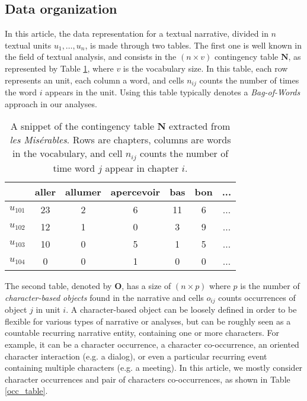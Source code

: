 \documentclass[
twocolumn,
]{ceurart}
\begin{document}
\subsection{Data organization}

In this article, the data representation for a textual narrative, divided in $n$ textual units $u_1, \ldots, u_n$, is made through two tables. The first one is well known in the field of textual analysis, and consists in the $(n \times v)$ contingency table $\mathbf{N}$, as represented by Table \ref{cont_table}, where $v$ is the vocabulary size. In this table, each row represents an unit, each column a word, and cells $n_{ij}$ counts the number of times the word $i$ appears in the unit. Using this table typically denotes a \emph{Bag-of-Words} approach in our analyses.

\begin{table}[h]
	\scriptsize
	\begin{tabular}{|c||c|c|c|c|c|c|}
		\hline
		& aller & allumer & apercevoir & bas & bon & ... \\
		\hline
		\hline 
		$u_{101}$ & 23 & 2 & 6 & 11 & 6 & ... \\
		\hline
		$u_{102}$ & 12 & 1 & 0 & 3 & 9 & ... \\
		\hline
		$u_{103}$ & 10 & 0 & 5 & 1 & 5 & ... \\
		\hline
		$u_{104}$ & 0 & 0 & 1 & 0 & 0 & ... \\
		\hline
	\end{tabular}
	\label{cont_table}
	\caption{A snippet of the contingency table $\mathbf{N}$ extracted from \emph{les Misérables}. Rows are chapters, columns are words in the vocabulary, and cell $n_{ij}$ counts the number of time word $j$ appear in chapter $i$.}
\end{table}

The second table, denoted by $\mathbf{O}$, has a size of $(n \times p)$ where $p$ is the number of \emph{character-based objects} found in the narrative and cells $o_{ij}$ counts occurrences of object $j$ in unit $i$. A character-based object can be loosely defined in order to be flexible for various types of narrative or analyses, but can be roughly seen as a countable recurring narrative entity, containing one or more characters. For example, it can be a character occurrence, a character co-occurrence, an oriented character interaction (e.g. a dialog), or even a particular recurring event containing multiple characters (e.g. a meeting). In this article, we mostly consider character occurrences and pair of characters co-occurrences, as shown in Table \ref{occ_table}. 
\end{document}
